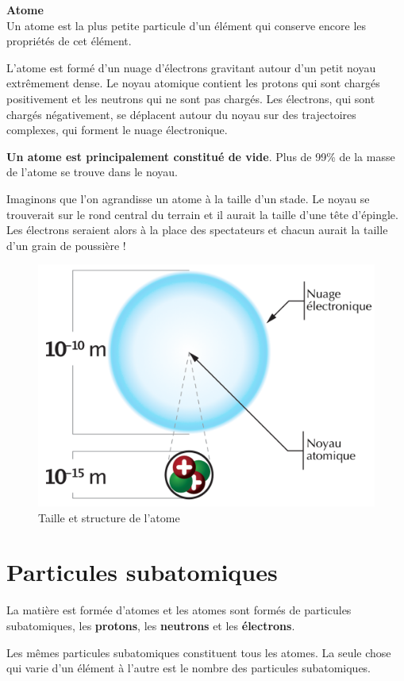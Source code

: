\documentclass[
  11pt,
  french,
  a4paper,
  openany]{book}
\begin{document}
\begin{tcolorbox}
\textbf{Atome}\\
Un atome est la plus petite particule d'un élément qui conserve encore les propriétés de cet élément.

\end{tcolorbox}

L'atome est formé d'un nuage d'électrons gravitant autour d'un petit noyau extrêmement dense. Le noyau atomique contient les protons qui sont chargés positivement et les neutrons qui ne sont pas chargés. Les électrons, qui sont chargés négativement, se déplacent autour du noyau sur des trajectoires complexes, qui forment le nuage électronique.

\textbf{Un atome est principalement constitué de vide}. Plus de 99\% de la masse de l'atome se trouve dans le noyau.

Imaginons que l'on agrandisse un atome à la taille d'un stade. Le noyau se trouverait sur le rond central du terrain et il aurait la taille d'une tête d'épingle. Les électrons seraient alors à la place des spectateurs et chacun aurait la taille d'un grain de poussière !

\begin{figure}

{\centering \includegraphics[width=0.33\linewidth]{images/ordre-grandeur-atome} 

}

\caption{Taille et structure de l'atome}\label{fig:ordre-grandeur-atome}
\end{figure}

\hypertarget{particules-subatomiques}{%
\section{Particules subatomiques}\label{particules-subatomiques}}

La matière est formée d'atomes et les atomes sont formés de particules subatomiques, les \textbf{protons}, les \textbf{neutrons} et les \textbf{électrons}.

Les mêmes particules subatomiques constituent tous les atomes. La seule chose qui varie d'un élément à l'autre est le nombre des particules subatomiques.
\end{document}
